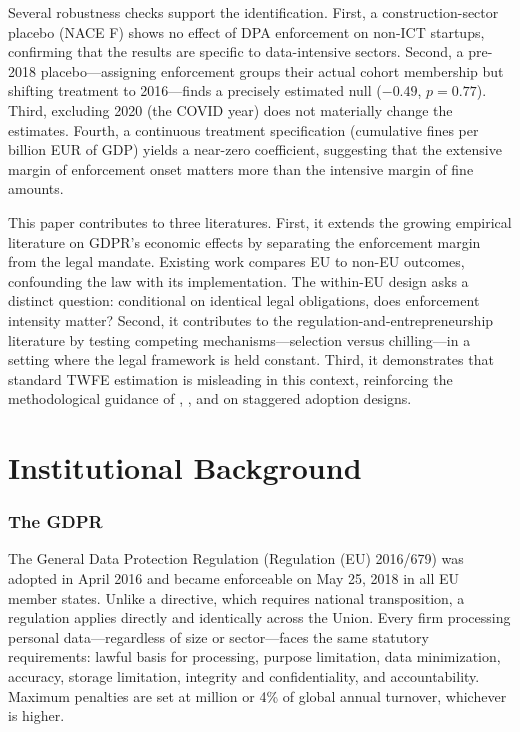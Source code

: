 \documentclass[12pt]{article}
\begin{document}
Several robustness checks support the identification. First, a construction-sector placebo (NACE F) shows no effect of DPA enforcement on non-ICT startups, confirming that the results are specific to data-intensive sectors. Second, a pre-2018 placebo---assigning enforcement groups their actual cohort membership but shifting treatment to 2016---finds a precisely estimated null ($-0.49$, $p = 0.77$). Third, excluding 2020 (the COVID year) does not materially change the estimates. Fourth, a continuous treatment specification (cumulative fines per billion EUR of GDP) yields a near-zero coefficient, suggesting that the extensive margin of enforcement onset matters more than the intensive margin of fine amounts.

This paper contributes to three literatures. First, it extends the growing empirical literature on GDPR's economic effects \citep{jia2021, aridor2024, goldberg2024, johnson2024, peukert2022, godinho2023, kretschmer2021} by separating the enforcement margin from the legal mandate. Existing work compares EU to non-EU outcomes, confounding the law with its implementation. The within-EU design asks a distinct question: conditional on identical legal obligations, does enforcement intensity matter? Second, it contributes to the regulation-and-entrepreneurship literature \citep{djankov2002, stigler1971, peltzman1976, bailey2022} by testing competing mechanisms---selection versus chilling---in a setting where the legal framework is held constant. Third, it demonstrates that standard TWFE estimation is misleading in this context, reinforcing the methodological guidance of \citet{goodmanbacon2021}, \citet{baker2022}, and \citet{roth2023} on staggered adoption designs.

\section{Institutional Background}

\subsubsection*{The GDPR} The General Data Protection Regulation (Regulation (EU) 2016/679) was adopted in April 2016 and became enforceable on May 25, 2018 in all EU member states. Unlike a directive, which requires national transposition, a regulation applies directly and identically across the Union. Every firm processing personal data---regardless of size or sector---faces the same statutory requirements: lawful basis for processing, purpose limitation, data minimization, accuracy, storage limitation, integrity and confidentiality, and accountability. Maximum penalties are set at  million or 4\% of global annual turnover, whichever is higher.
\end{document}
